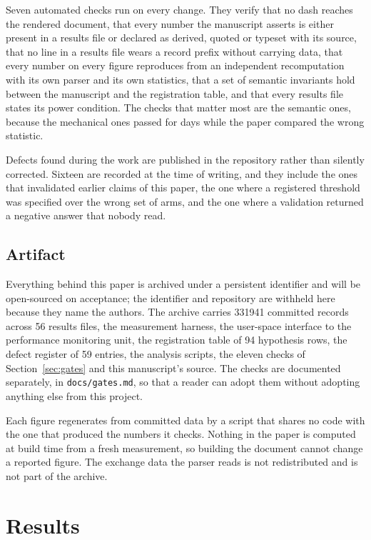 \documentclass[conference]{IEEEtran}
\begin{document}
Seven automated checks run on every change. They verify that no dash reaches the
rendered document, that every number the manuscript asserts is either present in
a results file or declared as derived, quoted or typeset with its source, that
no line in a results file wears a record prefix without carrying data, that
every number on every figure reproduces from an independent recomputation with
its own parser and its own statistics, that a set of semantic invariants hold
between the manuscript and the registration table, and that every results file
states its power condition. The checks that matter most are the semantic ones,
because the mechanical ones passed for days while the paper compared the wrong
statistic.

Defects found during the work are published in the repository rather than
silently corrected. Sixteen are recorded at the time of writing, and they
include the ones that invalidated earlier claims of this paper, the one where a
registered threshold was specified over the wrong set of arms, and the one where
a validation returned a negative answer that nobody read.

\subsection{Artifact}

Everything behind this paper is archived under a persistent identifier and
will be open-sourced on acceptance; the identifier and repository are withheld
here because they name the authors. The archive carries 331941 committed
records across 56 results files, the measurement harness, the user-space
interface to the performance monitoring unit, the registration table of 94
hypothesis rows, the defect register of 59 entries, the analysis scripts, the
eleven checks of Section~\ref{sec:gates} and this manuscript's source. The checks are documented separately, in \texttt{docs/gates.md}, so
that a reader can adopt them without adopting anything else from this project.

Each figure regenerates from committed data by a script that shares no code
with the one that produced the numbers it checks. Nothing in the paper is
computed at build time from a fresh measurement, so building the document
cannot change a reported figure. The exchange data the parser reads is not
redistributed and is not part of the archive.

\section{Results}
\end{document}
